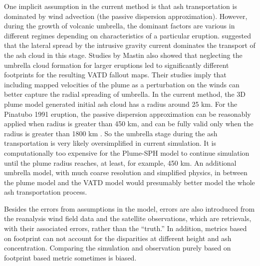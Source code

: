 \documentclass[utf8]{frontiersSCNS} %
\begin{document}
One implicit assumption in the current method is that ash transportation is dominated by wind advection (the passive dispersion approximation). However, during the growth of volcanic umbrella, the dominant factors are various in different regimes \citep{pouget2016interpretation} depending on characteristics of a particular eruption. \citet{webster2020operational} suggested that the lateral spread by the intrusive gravity current dominates the transport of the ash cloud in this stage. Studies by Mastin \citep{mastin2014modeling,mastin2020comparing} also showed that neglecting the umbrella cloud formation for larger eruptions led to significantly different footprints for the resulting VATD fallout maps. Their studies imply that including mapped velocities of the plume as a perturbation on the winds can better capture the radial spreading of umbrella. In the current method, the 3D plume model generated initial ash cloud has a radius around 25 km. For the Pinatubo 1991 eruption, the passive dispersion approximation can be reasonably applied when radius is greater than 450 km, and can be fully valid only when the radius is greater than 1800 km \citep{costa2013density}. So the umbrella stage during the ash transportation is very likely oversimplified in current simulation. It is computationally too expensive for the Plume-SPH model to continue simulation until the plume radius reaches, at least, for example, 450 km. An additional umbrella model, with much coarse resolution and simplified physics, in between the plume model and the VATD model would presumably better model the whole ash transportation process.

Besides the errors from assumptions in  the model, errors are also introduced from the reanalysis wind field data and the satellite observations, which are retrievals, with their associated errors, rather than the ``truth.'' In addition, metrics based on footprint can not account for the disparities at different height and ash concentration. Comparing the simulation and observation purely based on footprint based metric sometimes is biased.
\end{document}
